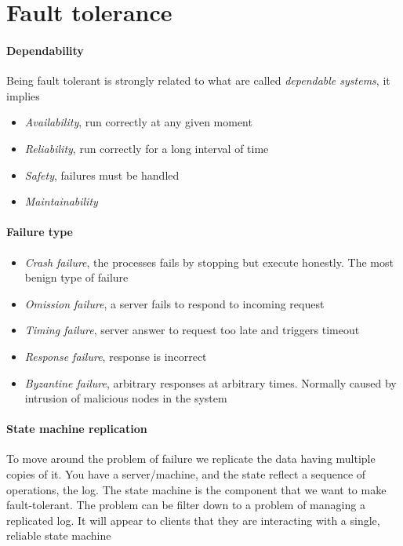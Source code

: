 \section{Fault tolerance}

\paragraph{Dependability}
Being fault tolerant is strongly related to what are called \textit{dependable systems}, it implies
\begin{itemize}
    \item \textit{Availability}, run correctly at any given moment
    \item \textit{Reliability}, run correctly for a long interval of time
    \item \textit{Safety}, failures must be handled
    \item \textit{Maintainability}
\end{itemize}

\paragraph{Failure type}
\begin{itemize}
    \item \textit{Crash failure}, the processes fails by stopping but execute honestly. The most benign type of failure
    \item \textit{Omission failure}, a server fails to respond to incoming request
    \item \textit{Timing failure}, server answer to request too late and triggers timeout
    \item \textit{Response failure}, response is incorrect
    \item \textit{Byzantine failure}, arbitrary responses at arbitrary times. Normally caused by intrusion of malicious nodes in the system
\end{itemize}

\paragraph{State machine replication}
To move around the problem of failure we replicate the data having multiple copies of it. You have a server/machine, and the state reflect a sequence of operations, the log. The state machine is the component that we want to make fault-tolerant. The problem can be filter down to a problem of managing a replicated log. It will appear to clients that they are interacting with a single, reliable state machine

